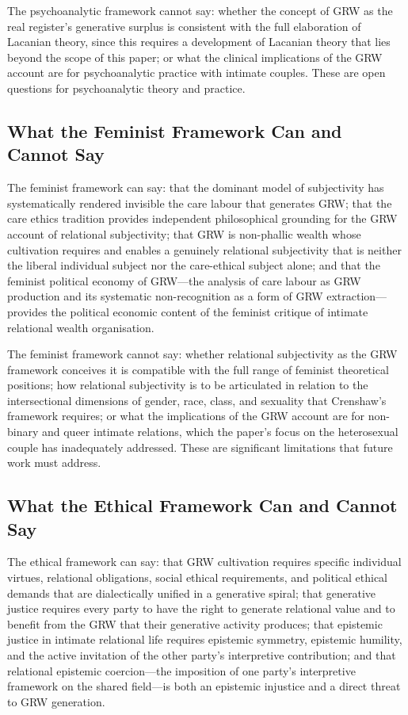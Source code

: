 The psychoanalytic framework cannot say: whether the concept of GRW as the real register's generative surplus is consistent with the full elaboration of Lacanian theory, since this requires a development of Lacanian theory that lies beyond the scope of this paper; or what the clinical implications of the GRW account are for psychoanalytic practice with intimate couples. These are open questions for psychoanalytic theory and practice.

\subsection{What the Feminist Framework Can and Cannot Say}
\label{p15:subsec:conc_fem}

\noindent
The feminist framework can say: that the dominant model of subjectivity has systematically rendered invisible the care labour that generates GRW; that the care ethics tradition provides independent philosophical grounding for the GRW account of relational subjectivity; that GRW is non-phallic wealth whose cultivation requires and enables a genuinely relational subjectivity that is neither the liberal individual subject nor the care-ethical subject alone; and that the feminist political economy of GRW---the analysis of care labour as GRW production and its systematic non-recognition as a form of GRW extraction---provides the political economic content of the feminist critique of intimate relational wealth organisation.

The feminist framework cannot say: whether relational subjectivity as the GRW framework conceives it is compatible with the full range of feminist theoretical positions; how relational subjectivity is to be articulated in relation to the intersectional dimensions of gender, race, class, and sexuality that Crenshaw's framework requires; or what the implications of the GRW account are for non-binary and queer intimate relations, which the paper's focus on the heterosexual couple has inadequately addressed. These are significant limitations that future work must address.

\subsection{What the Ethical Framework Can and Cannot Say}
\label{p15:subsec:conc_eth}

\noindent
The ethical framework can say: that GRW cultivation requires specific individual virtues, relational obligations, social ethical requirements, and political ethical demands that are dialectically unified in a generative spiral; that generative justice requires every party to have the right to generate relational value and to benefit from the GRW that their generative activity produces; that epistemic justice in intimate relational life requires epistemic symmetry, epistemic humility, and the active invitation of the other party's interpretive contribution; and that relational epistemic coercion---the imposition of one party's interpretive framework on the shared field---is both an epistemic injustice and a direct threat to GRW generation.

